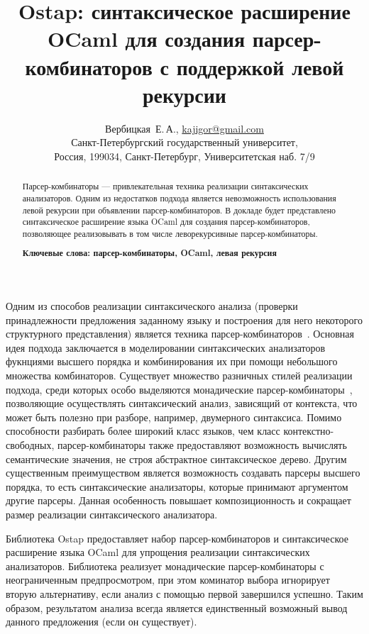 \documentclass [a4paper] {article}
\begin{document}
\title{Ostap: синтаксическое расширение OCaml для создания парсер-комбинаторов с поддержкой левой рекурсии}
\author{
  Вербицкая~Е.\,А., \url {kajigor@gmail.com} \\
  Санкт-Петербургский государственный университет, \\
  Россия, 199034, Санкт-Петербург, Университетская наб. 7/9 \\ 
}

\maketitle

\begin{abstract}
Парсер-комбинаторы --- привлекательная техника реализации синтаксических анализаторов. Одним из недостатков подхода является невозможность использования левой рекурсии при объявлении парсер-комбинаторов. В докладе будет представлено синтаксическое расширение языка OCaml для создания парсер-комбинаторов, позволяющее реализовывать в том числе леворекурсивные парсер-комбинаторы.

\vspace{1em}
\textbf{Ключевые слова: парсер-комбинаторы, OCaml, левая рекурсия}  
\end{abstract}

Одним из способов реализации синтаксического анализа (проверки принадлежности предложения заданному языку и построения для него некоторого структурного представления) является техника парсер-комбинаторов~\cite{hutton1992higher}. Основная идея подхода заключается в моделировании синтаксических анализаторов фукнциями высшего порядка и комбинирования их при помощи небольшого множества комбинаторов. Существует множество разничных стилей реализации подхода, среди которых особо выделяются монадические парсер-комбинаторы~\cite{nott237}, позволяющие осуществлять синтаксический анализ, зависящий от контекста, что может быть полезно при разборе, например, двумерного синтаксиса. Помимо способности разбирать более широкий класс языков, чем класс контекстно-свободных, парсер-комбинаторы также предоставляют возможность вычислять семантические значения, не строя абстрактное синтаксическое дерево. Другим существенным преимуществом является возможность создавать парсеры высшего порядка, то есть синтаксические анализаторы, которые принимают аргументом другие парсеры. Данная особенность повышает композиционность и сокращает размер реализации синтаксического анализатора. 

Библиотека Ostap предоставляет набор парсер-комбинаторов и синтаксическое расширение языка OCaml для упрощения реализации синтаксических анализаторов. Библиотека реализует монадические парсер-комбинаторы с неограниченным предпросмотром, при этом коминатор выбора игнорирует вторую альтернативу, если анализ с помощью первой завершился успешно. Таким образом, результатом анализа всегда является единственный возможный вывод данного предложения (если он существует). 
\end{document}
